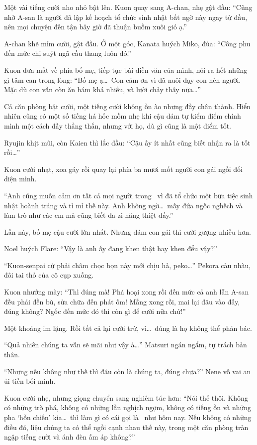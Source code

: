 \documentclass[../main.tex]{subfiles}
\begin{document}
Một vài tiếng cười nho nhỏ bật lên. Kuon quay sang A-chan, nhẹ gật đầu: ``Cũng nhờ A-san là người đã lập kế hoạch tổ chức sinh nhật bất ngờ này ngay từ đầu, nên mọi chuyện đến tận bây giờ đã thuận buồm xuôi gió ạ.''

A-chan khẽ mỉm cười, gật đầu. Ở một góc, Kanata huých Miko, đùa: ``Công phu đến mức chị suýt ngã cầu thang luôn đó.''

Kuon đưa mắt về phía bố mẹ, tiếp tục bài diễn văn của mình, nói ra hết những gì tâm can trong lòng: ``Bố mẹ ạ\dots\ Con cảm ơn vì đã nuôi dạy con nên người. Mặc dù con vẫn còn ăn bám khá nhiều, và lười chảy thây nữa\dots''

Cả căn phòng bật cười, một tiếng cười không ồn ào nhưng đầy chân thành. Hiển nhiên cũng có một số tiếng há hốc mồm nhẹ khi cậu dám tự kiểm điểm chính mình một cách đầy thẳng thắn, nhưng với họ, dù gì cũng là một điểm tốt.

Ryujin khịt mũi, còn Kaien thì lắc đầu: ``Cậu ấy ít nhất cũng biết nhận ra là tốt rồi\dots''

Kuon cười nhạt, xoa gáy rồi quay lại phía ba mươi mốt người con gái ngồi đối diện mình.

``Anh cũng muốn cảm ơn tất cả mọi người trong \hll\ vì đã tổ chức một bữa tiệc sinh nhật hoành tráng và tỉ mỉ thế này. Anh không ngờ\dots\ mấy đứa ngốc nghếch và làm trò như các em mà cũng biết đa-zi-năng thiệt đấy.''

Lần này, bố mẹ cậu cười lớn nhất. Nhưng đám con gái thì cười gượng nhiều hơn.

Noel huých Flare: ``Vậy là anh ấy đang khen thật hay khen đểu vậy?''

``Kuon-senpai cứ phải châm chọc bọn này mới chịu hả, peko\dots'' Pekora càu nhàu, đôi tai thỏ của cô cụp xuống.

Kuon nhướng mày: ``Thì đúng mà! Phá hoại xong rồi đến mức cả anh lẫn A-san đều phải đền bù, sửa chữa đến phát ốm! Mắng xong rồi, mai lại đâu vào đấy, đúng không? Ngốc đến mức đó thì còn gì để cười nữa chứ!''

Một khoảng im lặng. Rồi tất cả lại cười trừ, vì\dots\ đúng là họ không thể phản bác.

``Quả nhiên chúng ta vẫn sẽ mãi như vậy à\dots'' Matsuri ngán ngẩm, tự trách bản thân.

``Nhưng nếu không như thế thì đâu còn là chúng ta, đúng chưa?'' Nene vỗ vai an ủi tiền bối mình.

Kuon cười nhẹ, nhưng giọng chuyển sang nghiêm túc hơn: ``Nói thế thôi. Không có những trò phá, không có những lần nghịch ngợm, không có tiếng ồn và những pha `hỗn chiến' kia\dots\ thì làm gì có cái gọi là \hll\ như hôm nay. Nếu không có những điều đó, liệu chúng ta có thể ngồi cạnh nhau thế này, trong một căn phòng tràn ngập tiếng cười và ánh đèn ấm áp không?''
\end{document}
